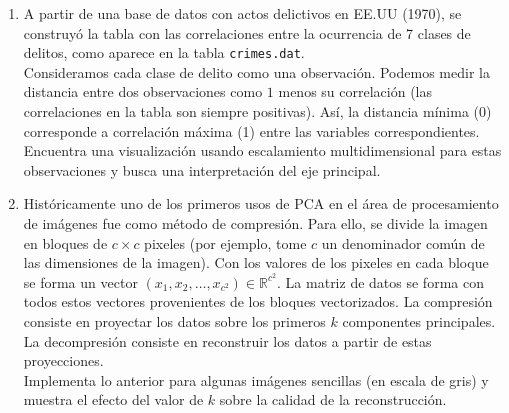 \documentclass{article}
\newcommand {\RR}{\mathbb{R}}
\begin{document}
\begin{sf}
\begin{enumerate}
\bigskip

	
\item
A partir de una base de datos con actos delictivos en EE.UU (1970), se construyó la tabla con las correlaciones entre la ocurrencia de 7 clases de delitos, como aparece en la tabla \texttt{crimes.dat}. \\
Consideramos cada clase de delito como una observación. Podemos medir la distancia entre dos observaciones como $1$ menos su correlación (las correlaciones en la tabla son siempre positivas). Así, la distancia mínima (0) corresponde a correlación máxima (1) entre las variables correspondientes.  \\

Encuentra una visualización usando escalamiento multidimensional para estas observaciones y busca una interpretación del eje principal.

\bigskip



\item
Históricamente uno de los primeros usos de PCA en el área de procesamiento de imágenes fue como método de compresión. Para ello, se divide la imagen en bloques de $c \times c$ pixeles (por ejemplo, tome $c$ un denominador común de las dimensiones de la imagen). Con los valores de los pixeles en cada bloque se forma un vector $(x_1, x_2, \ldots, x_{c^2}) \in \RR^{c^2}$. La matriz de datos se forma con todos estos vectores provenientes de los bloques vectorizados. La compresión consiste en proyectar los datos sobre los primeros $k$ componentes principales. La decompresión consiste en reconstruir los datos a partir de estas proyecciones. \\

Implementa lo anterior para algunas imágenes sencillas (en escala de gris) y muestra el efecto del valor de $k$ sobre la calidad de la reconstrucción. %
\end{enumerate}


\underline{\hspace{15cm}}

\bigskip
\noindent 

\end{sf}
\end{document}
